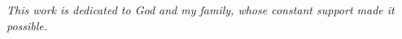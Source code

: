 \documentclass[
12pt,		%
openright,	%
twoside,  %
a4paper,			%
chapter=TITLE,		%
english,			%
french,				%
spanish,			%
brazil				%
]{USPSC}
\renewcommand{\footnotesize}{\small} %
\begin{document}
% 	
% 		
% 
% 




%



\begin{dedicatoria}
   \vspace*{\fill}
   \centering
   \noindent
   \textit{ This work is dedicated to God and my family, whose constant support made it possible.} \vspace*{\fill}
\end{dedicatoria}
\end{document}
